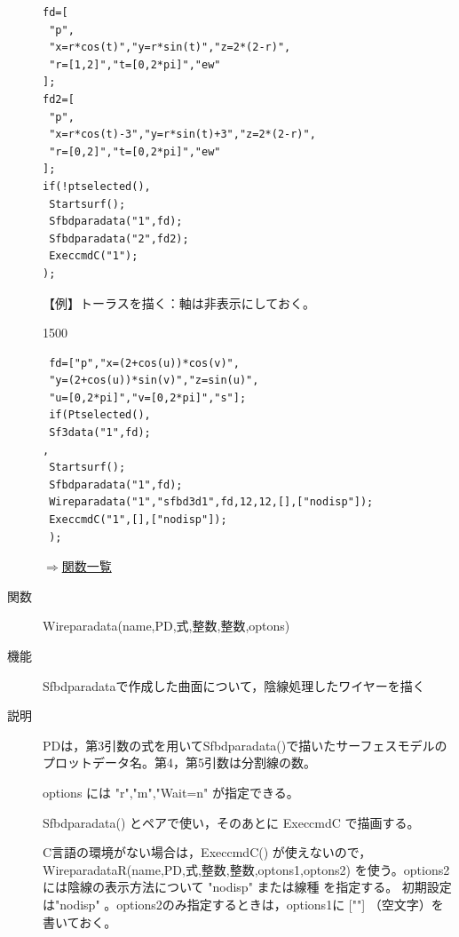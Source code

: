 \documentclass[papersize,a4paper,12pt,uplatex]{jsarticle}
\begin{document}
\begin{description}
\begin{verbatim}
fd=[
 "p",
 "x=r*cos(t)","y=r*sin(t)","z=2*(2-r)",
 "r=[1,2]","t=[0,2*pi]","ew"
];
fd2=[
 "p",
 "x=r*cos(t)-3","y=r*sin(t)+3","z=2*(2-r)",
 "r=[0,2]","t=[0,2*pi]","ew"
];
if(!ptselected(),
 Startsurf(); 
 Sfbdparadata("1",fd);
 Sfbdparadata("2",fd2);
 ExeccmdC("1");
);
\end{verbatim}

\begin{center}

\end{center}

\vspace{\baselineskip}
【例】トーラスを描く：軸は非表示にしておく。

\begin{layer}{150}{0}
\end{layer}

\begin{verbatim}
 fd=["p","x=(2+cos(u))*cos(v)",
 "y=(2+cos(u))*sin(v)","z=sin(u)",
 "u=[0,2*pi]","v=[0,2*pi]","s"];
 if(Ptselected(),
 Sf3data("1",fd);
,
 Startsurf();
 Sfbdparadata("1",fd);
 Wireparadata("1","sfbd3d1",fd,12,12,[],["nodisp"]);
 ExeccmdC("1",[],["nodisp"]);
 );
\end{verbatim}


\begin{flushright} \hyperlink{functionlist}{$\Rightarrow$関数一覧}\end{flushright}

\hypertarget{wireparadata}{}
\item[関数]Wireparadata(name,PD,式,整数,整数,optons)
\item[機能]Sfbdparadataで作成した曲面について，陰線処理したワイヤーを描く
\item[説明]PDは，第3引数の式を用いてSfbdparadata()で描いたサーフェスモデルのプロットデータ名。第4，第5引数は分割線の数。

options には "r","m","Wait=n" が指定できる。

Sfbdparadata() とペアで使い，そのあとに ExeccmdC で描画する。

C言語の環境がない場合は，ExeccmdC() が使えないので，WireparadataR(name,PD,式,整数,整数,optons1,optons2) を使う。options2には陰線の表示方法について "nodisp" または線種 を指定する。 初期設定は"nodisp" 。options2のみ指定するときは，options1に [""] （空文字）を書いておく。


\end{description}
\end{document}
